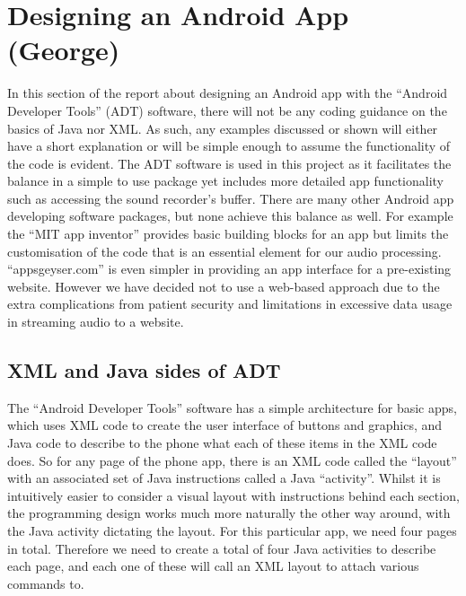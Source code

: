 \section{Designing an Android App (George)}
\label{sec:android-george}
In this section of the report about designing an Android app with the ``Android Developer Tools'' (ADT) software, there will not be any coding guidance on the basics of Java nor XML. As such, any examples discussed or shown will either have a short explanation or will be simple enough to assume the functionality of the code is evident. The ADT software is used in this project as it facilitates the balance in a simple to use package yet includes more detailed app functionality such as accessing the sound recorder’s buffer. There are many other Android app developing software packages, but none achieve this balance as well. For example the ``MIT app inventor'' provides basic building blocks for an app but limits the customisation of the code that is an essential element for our audio processing. ``appsgeyser.com'' is even simpler in providing an app interface for a pre-existing website. However we have decided not to use a web-based approach due to the extra complications from patient security and limitations in excessive data usage in streaming audio to a website.
\subsection{XML and Java sides of ADT}
The ``Android Developer Tools'' software has a simple architecture for basic apps, which uses XML code to create the user interface of buttons and graphics, and Java code to describe to the phone what each of these items in the XML code does. So for any page of the phone app, there is an XML code called the ``layout'' with an associated set of Java instructions called a Java ``activity''. Whilst it is intuitively easier to consider a visual layout with instructions behind each section, the programming design works much more naturally the other way around, with the Java activity dictating the layout. For this particular app, we need four pages in total. Therefore we need to create a total of four Java activities to describe each page, and each one of these will call an XML layout to attach various commands to.
